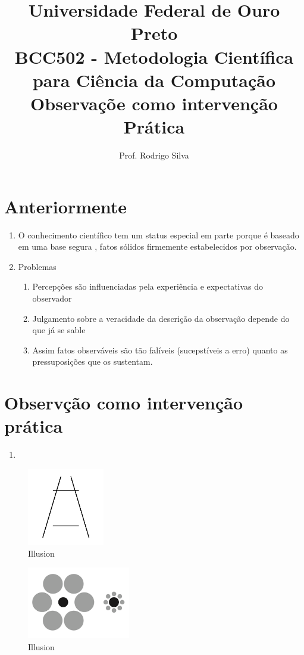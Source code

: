 \documentclass{article}
\title{\vspace{-2 cm}Universidade Federal de Ouro Preto \\ BCC502 - Metodologia Científica para Ciência da Computação \\\textbf{ Observaçõe como intervenção Prática}}
\author{Prof. Rodrigo Silva}
\date{}
\begin{document}
\maketitle

\section{Anteriormente}

\begin{enumerate}
    \item O conhecimento científico tem um status especial em parte porque é baseado em uma base segura , fatos sólidos firmemente estabelecidos por observação.
    \item Problemas
    \begin{enumerate}
        \item Percepções são influenciadas pela experiência e expectativas do observador
        \item Julgamento sobre a veracidade da descrição da observação depende do que já se sable 
        \item Assim fatos observáveis são tão falíveis (sucepstíveis a erro) quanto as pressuposições que os sustentam.    
    \end{enumerate}
\end{enumerate}

\section{Observção como intervenção prática}

\begin{enumerate}
    \item 
\end{enumerate}

\begin{figure}[!htbp]
    \centering
    \includegraphics[width=0.3\textwidth]{Ponzo_Illusion.png}
    \caption{Illusion}
    \label{fig:illusion1}
\end{figure}

\begin{figure}[!htbp]
    \centering
    \includegraphics[width=0.4\textwidth]{ilusao_ebin.png}
    \caption{Illusion}
    \label{fig:illusion2}
\end{figure}
\end{document}
